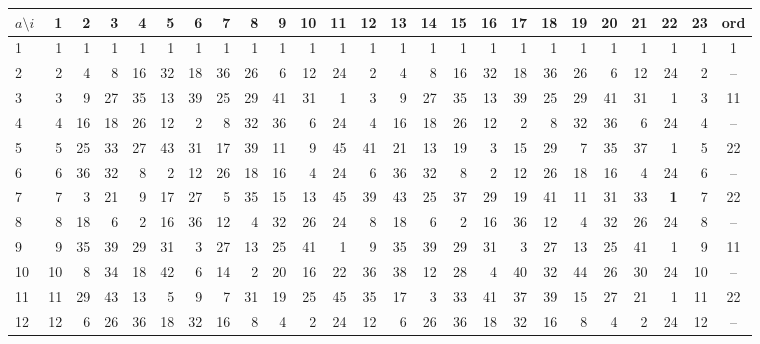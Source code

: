 \begin{refsegment}
\begin{table}[ht]
\label{SrcArith3c}
{\textmd \small
\begin{center}
\begin{tabular}{|p{16 pt}||@{\:}r@{\:}|@{\:}r@{\:}|@{\:}r@{\:}|@{\:}r@{\:}|@{\:}r@{\:}|@{\:}r@{\:}|@{\:}r@{\:}|@{\:}r@{\:}|@{\:}r@{\:}|@{\:}r@{\:}|@{\:}r@{\:}|@{\:}r@{\:}|@{\:}r@{\:}|@{\:}r@{\:}|@{\:}r@{\:}|@{\:}r@{\:}|@{\:}r@{\:}|@{\:}r@{\:}|@{\:}r@{\:}|@{\:}r@{\:}|@{\:}r@{\:}|@{\:}r@{\:}|@{\:}r@{\:}|c|}
\hline
$a \setminus i$   & 1 & 2 & 3 & 4 & 5 & 6 & 7 & 8 & 9 & 10 & 11 & 12 & 13 & 14 & 15 & 16 & 17 & 18 & 19 & 20 & 21 & 22 & 23 & ord\\
\hline
\hline
1    & 1  & 1  & 1  & 1  & 1  & 1  & 1  & 1  & 1  & 1  & 1  & 1  & 1  & 1  & 1  & 1  & 1  & 1  & 1  & 1  & 1  & 1  & 1 & 1\\
\hline
2 & 2  & 4  & 8 & 16 & 32 & 18 & 36 & 26  & 6 & 12 & 24  & 2  & 4  & 8 & 16 & 32 & 18 & 36 & 26  & 6 & 12 & 24  & 2 & --\\
\hline
3 & 3  & 9 & 27 & 35 & 13 & 39 & 25 & 29 & 41 & 31  & 1  & 3  & 9 & 27 & 35 & 13 & 39 & 25 & 29 & 41 & 31  & 1  & 3 & 11\\
\hline
4  & 4 & 16 & 18 & 26 & 12  & 2  & 8 & 32 & 36  & 6 & 24  & 4 & 16 & 18 & 26 & 12  & 2  & 8 & 32 & 36  & 6 & 24  & 4 & --\\
\hline
5 & 5 & 25 & 33 & 27 & 43 & 31 & 17 & 39 & 11  & 9 & 45 & 41 & 21 & 13 & 19  & 3 & 15 & 29  & 7 & 35 & 37  & 1  & 5 & 22\\
\hline
6 & 6 & 36 & 32  & 8  & 2 & 12 & 26 & 18 & 16  & 4 & 24  & 6 & 36 & 32  & 8  & 2 & 12 & 26 & 18 & 16  & 4 & 24  & 6 & --\\
\hline
7 & 7  & 3 & 21  & 9 & 17 & 27  & 5 & 35 & 15 & 13 & 45 & 39 & 43 & 25 & 37 & 29 & 19 & 41 & 11 & 31 & 33  & \textbf{1}  & 7 & 22\\
\hline
8 & 8 & 18  & 6  & 2 & 16 & 36 & 12  & 4 & 32 & 26 & 24  & 8 & 18  & 6  & 2 & 16 & 36 & 12  & 4 & 32 & 26 & 24  & 8 & --\\
\hline
9 & 9 & 35 & 39 & 29 & 31  & 3 & 27 & 13 & 25 & 41  & 1  & 9 & 35 & 39 & 29 & 31  & 3 & 27 & 13 & 25 & 41  & 1  & 9 & 11\\
\hline
10 & 10  & 8 & 34 & 18 & 42  & 6 & 14  & 2 & 20 & 16 & 22 & 36 & 38 & 12 & 28  & 4 & 40 & 32 & 44 & 26 & 30 & 24 & 10 & --\\
\hline
11 & 11 & 29 & 43 & 13  & 5  & 9  & 7 & 31 & 19 & 25 & 45 & 35 & 17  & 3 & 33 & 41 & 37 & 39 & 15 & 27 & 21  & 1 & 11 & 22\\
\hline
12 & 12  & 6 & 26 & 36 & 18 & 32 & 16  & 8  & 4  & 2 & 24 & 12  & 6 & 26 & 36 & 18 & 32 & 16  & 8  & 4  & 2 & 24 & 12 & --\\

\end{tabular}
\end{center}}
\end{table}
\end{refsegment}
